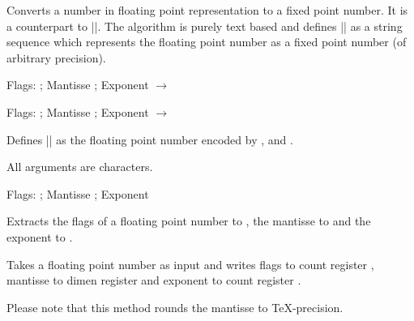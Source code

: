 \begin{command}{}
	Converts a number in floating point representation to a fixed point number. It is a counterpart to |\pgfmathfloatparsenumber|. The algorithm is purely text based and defines |\pgfmathresult| as a string sequence which represents the floating point number  as a fixed point number (of arbitrary precision).

\begin{codeexample}[]
\pgfmathfloattomacro{\pgfmathresult}{\F}{\M}{\E}
Flags: \F; Mantisse \M; Exponent \E
$\to$ 
\pgfmathfloattofixed{\pgfmathresult}
\pgfmathresult
\end{codeexample}

\begin{codeexample}[]
\pgfmathfloattomacro{\pgfmathresult}{\F}{\M}{\E}
Flags: \F; Mantisse \M; Exponent \E
$\to$
\pgfmathfloattofixed{\pgfmathresult}
\pgfmathresult 
\end{codeexample}
\end{command}

\begin{command}{}
	Defines |\pgfmathresult| as the floating point number encoded by
	,  and .
	
	All arguments are characters.
\begin{codeexample}[]
\pgfmathfloattomacro{\pgfmathresult}{\F}{\M}{\E}
Flags: \F; Mantisse \M; Exponent \E
\end{codeexample}
\end{command}

\begin{command}{}
	Extracts the flags of a floating point number  to , the mantisse to  and the exponent to .
\end{command}

\begin{command}{}
	Takes a floating point number  as input and writes flags to count
	register , mantisse to dimen register  and exponent to count
	register .

	Please note that this method rounds the mantisse to \TeX-precision.
\end{command}

